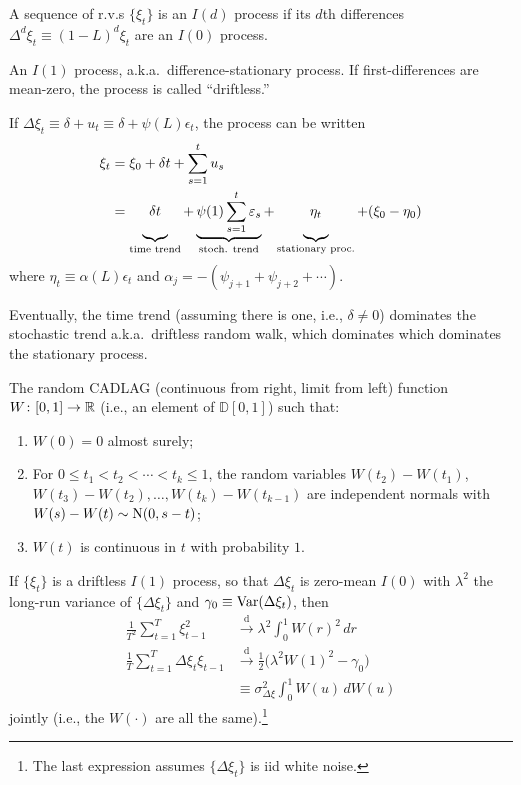 \documentclass[8pt,letterpaper, landscape]{extarticle} %
\begin{document}
\begin{multicols}{3}
\begin{description}
 A sequence of r.v.s $ \{ \xi_t \} $ is an $ I(d) $ process if its $ d $th differences $ \Delta^d \xi_t \equiv (1 - L)^{d} \xi_t $ are an $ I(0) $ process.

 An $ I(1) $ process, a.k.a.\ difference-stationary process. If first-differences are mean-zero, the process is called ``driftless.''

If $ \Delta \xi_t \equiv \delta + u_t \equiv \delta + \psi (L) \epsilon_t $, the process can be written
\begin{align*}
\xi_t &= \xi_0 + \delta t + \sum_{s=1}^{t} u_s \\
&= \underbrace{\delta t \vphantom{\sum_{s=1}^{t}}}_{\text{time trend}} + \underbrace{\psi(1) \sum_{s=1}^{t} \epsilon_s}_{\text{stoch. trend}} + \underbrace{\eta_t \vphantom{\sum_{s=1}^{t}}}_{\text{stationary proc.}} + (\xi_0 - \eta_0)
\end{align*}
where $ \eta_t \equiv \alpha(L) \epsilon_t $ and $ \alpha_j = -(\psi_{j+1} + \psi_{j+2} + \dotsb) $.

Eventually, the time trend (assuming there is one, i.e., $ \delta \neq 0 $) dominates the stochastic trend a.k.a.\ driftless random walk, which dominates which dominates the stationary process.

 The random CADLAG (continuous from right, limit from left) function $ W \colon [0,1] \to \mathbb{R} $ (i.e., an element of $ \mathbb{D}[0,1] $) such that:
\begin{enumerate}
\item $ W(0) = 0 $ almost surely;
\item For $ 0 \leq t_1 < t_2 < \dotsb < t_k \leq 1 $, the random variables $ W(t_2) - W(t_1) $, $ W(t_3) - W(t_2), \dotsc , W(t_{k}) - W(t_{k-1})  $ are independent normals with $ W(s) - W(t) \sim \operatorname{N} (0, s-t) $;
\item $ W(t) $ is continuous in $ t $ with probability $ 1 $.
\end{enumerate}

If $ \{ \xi_t \} $ is a driftless $ I(1) $ process, so that $ \Delta \xi_t $ is zero-mean $ I(0) $ with $ \lambda^2 $ the long-run variance of $ \{ \Delta \xi_t \} $ and $ \gamma_0 \equiv \operatorname{Var} (\Delta \xi_t) $, then
\begin{align*}
\frac{1}{T^2} \sum_{t=1}^{T} \xi_{t-1}^{2} &\xrightarrow{\text{d}} \lambda^2 \int_{0}^{1} W(r)^{2} \, dr \\
\frac{1}{T} \sum_{t=1}^{T} \Delta \xi_{t} \xi_{t-1} &\xrightarrow{\text{d}} \tfrac{1}{2} \bigl( \lambda^2 W(1)^{2} - \gamma_0 \bigr ) \\
&\equiv \sigma^2_{\Delta \xi} \int_{0}^{1} W(u) \, dW(u)
\end{align*}
jointly (i.e., the $ W(\cdot) $ are all the same).\footnote{The last expression assumes $ \{ \Delta \xi_t \} $ is iid white noise.}


\end{description}
\end{multicols}
\end{document}
